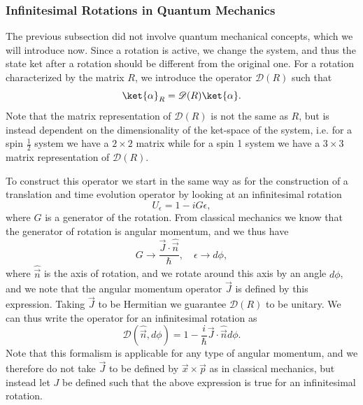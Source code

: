 \subsubsection{Infinitesimal Rotations in Quantum Mechanics}
The previous subsection did not involve quantum mechanical concepts, which we will introduce now. Since a rotation is active, we change the system, and thus the state ket after a rotation should be different from the original one. For a rotation characterized by the matrix $R$, we introduce the operator $\mathscr{D}(R)$ such that 
\begin{equation}
    \ket{\alpha}_R = \mathscr{D}(R) \ket{\alpha}.
\end{equation}
Note that the matrix representation of $\mathscr{D}(R)$ is not the same as $R$, but is instead dependent on the dimensionality of the ket-space of the system, i.e. for a spin $\frac{1}{2}$ system we have a $2\times 2$ matrix while for a spin 1 system we have a $3\times 3$ matrix representation of $\mathscr{D}(R)$.

To construct this operator we start in the same way as for the construction of a translation and time evolution operator by looking at an infinitesimal rotation
\begin{equation}
    U_\epsilon = 1 - i G \epsilon,
\end{equation}
where $G$ is a generator of the rotation. From classical mechanics we know that the generator of rotation is angular momentum, and we thus have
\begin{equation}
    G \to \frac{\vec{J}\cdot \hat{\vec{n}}}{\hbar}, \quad \epsilon \to d\phi,
\end{equation}
where $\hat{\vec{n}}$ is the axis of rotation, and we rotate around this axis by an angle $d\phi$, and we note that the angular momentum operator $\vec{J}$ is defined by this expression. Taking $\vec{J}$ to be Hermitian we guarantee $\mathscr{D}(R)$ to be unitary. We can thus write the operator for an infinitesimal rotation as 
\begin{equation}
    \mathscr{D}(\hat{\vec{n}}, d\phi) = 1 - \frac{i}{\hbar} \vec{J} \cdot \hat{\vec{n}} d\phi.\label{eq:infinitesimalRotation}
\end{equation}
Note that this formalism is applicable for any type of angular momentum, and we therefore do not take $\vec{J}$ to be defined by $\vec{x} \times \vec{p}$ as in classical mechanics, but instead let $J$ be defined such that the above expression is true for an infinitesimal rotation.

